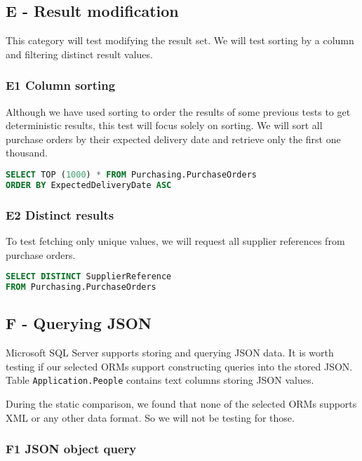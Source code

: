 \subsection{E - Result modification}
This category will test modifying the result set. We will test sorting by a column and filtering distinct result values.

\subsubsection*{E1 Column sorting} \label{query:e1}
Although we have used sorting to order the results of some previous tests to get deterministic results, this test will focus solely on sorting.
We will sort all purchase orders by their expected delivery date and retrieve only the first one thousand.

\begin{lstlisting}[language=SQL]
SELECT TOP (1000) * FROM Purchasing.PurchaseOrders 
ORDER BY ExpectedDeliveryDate ASC
\end{lstlisting}

\subsubsection*{E2 Distinct results} \label{query:e2}
To test fetching only unique values, we will request all supplier references from purchase orders.

\begin{lstlisting}[language=SQL]
SELECT DISTINCT SupplierReference 
FROM Purchasing.PurchaseOrders
\end{lstlisting}

\subsection{F - Querying JSON}
Microsoft SQL Server supports storing and querying JSON data\cite{mssqljson}. It is worth testing if our selected ORMs support constructing queries into the stored JSON.
Table \texttt{Application.People} contains text columns storing JSON values.

During the static comparison, we found that none of the selected ORMs supports XML or any other data format. So we will not be testing for those.

\subsubsection*{F1 JSON object query} \label{query:f1}

